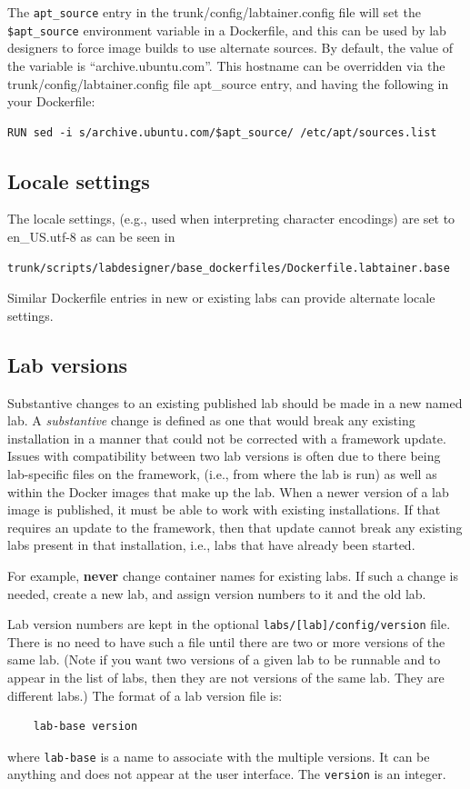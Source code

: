 \documentclass[12pt]{article}
\begin{document}
The {\tt apt\_source} entry in the trunk/config/labtainer.config file will set the {\tt \$apt\_source}
environment variable in a Dockerfile, and this can be used by lab designers to force image builds to use
alternate sources.  By default, the value of the variable is ``archive.ubuntu.com''.  This hostname can be 
overridden via the trunk/config/labtainer.config file apt\_source entry, and having the following in your Dockerfile:
\begin{verbatim}
RUN sed -i s/archive.ubuntu.com/$apt_source/ /etc/apt/sources.list
\end{verbatim}

\subsection{Locale settings}
The locale settings, (e.g., used when interpreting character encodings) are set to en\_US.utf-8 
as can be seen in 
\begin{verbatim}
trunk/scripts/labdesigner/base_dockerfiles/Dockerfile.labtainer.base
\end{verbatim}
Similar Dockerfile entries in new or existing labs can provide alternate locale settings.

\subsection{Lab versions}
Substantive changes to an existing published lab should be made in
a new named lab.  A \textit{substantive} change is defined as one that would
break any existing installation in a manner that could not be corrected
with a framework update.  Issues with compatibility between two
lab versions is often due to there being lab-specific files on the framework,
(i.e., from where the lab is run) as well as within the Docker images that
make up the lab.  When a newer version of a lab image is published, it must 
be able to work with existing installations.  If that requires an update to the
framework, then that update cannot break any existing labs present in that
installation, i.e., labs that have already been started.

For example, \textbf{never} change container names for existing labs.  If such
a change is needed, create a new lab, and assign version numbers to
it and the old lab.  

Lab version numbers are kept in the optional {\tt labs/[lab]/config/version} file.
There is no need to have such a file until there are two or more versions of the
same lab.  (Note if you want two versions of a given lab to be runnable and to appear
in the list of labs, then they are not versions of the same lab.  They are different
labs.)  The format of a lab version file is:
\begin{verbatim}
    lab-base version
\end{verbatim}
where {\tt lab-base} is a name to associate with the multiple versions.  It can be
anything and does not appear at the user interface.  The {\tt version} is an integer.
\end{document}
